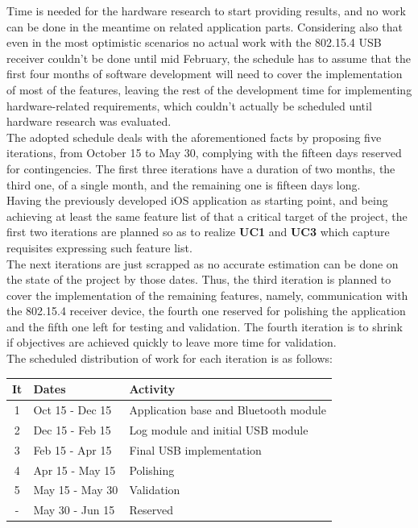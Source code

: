 			Time is needed for the hardware research to start providing results, and no work can be done in the meantime on related application parts. Considering also that even in the most optimistic scenarios no actual work with the 802.15.4 USB receiver couldn't be done until mid February, the schedule has to assume that the first four months of software development will need to cover the implementation of most of the features, leaving the rest of the development time for implementing hardware-related requirements, which couldn't actually be scheduled until hardware research was evaluated.\\

			The adopted schedule deals with the aforementioned facts by proposing five iterations, from October 15 to May 30, complying with the fifteen days reserved for contingencies. The first three iterations have a duration of two months, the third one, of a single month, and the remaining one is fifteen days long.\\

			Having the previously developed iOS application as starting point, and being achieving at least the same feature list of that a critical target of the project, the first two iterations are planned so as to realize \textbf{UC1} and \textbf{UC3} which capture requisites expressing such feature list.\\

			The next iterations are just scrapped as no accurate estimation can be done on the state of the project by those dates. Thus, the third iteration is planned to cover the implementation of the remaining features, namely, communication with the 802.15.4 receiver device, the fourth one reserved for polishing the application and the fifth one left for testing and validation. The fourth iteration is to shrink if objectives are achieved quickly to leave more time for validation.\\

			The scheduled distribution of work for each iteration is as follows:\\

			\begin{tabular}{| c | l | l |} %
				\hline
				It & Dates & Activity \\ \hline
				1 & Oct 15 - Dec 15 & Application base and Bluetooth module\\ \hline
				2 & Dec 15 - Feb 15 & Log module and initial USB module\\ \hline
				3 & Feb 15 - Apr 15 & Final USB implementation \\ \hline
				4 & Apr 15 - May 15 & Polishing \\ \hline
				5 & May 15 - May 30 & Validation \\ \hline
				- & May 30 - Jun 15 & Reserved \\
				\hline
			\end{tabular}\\\\

